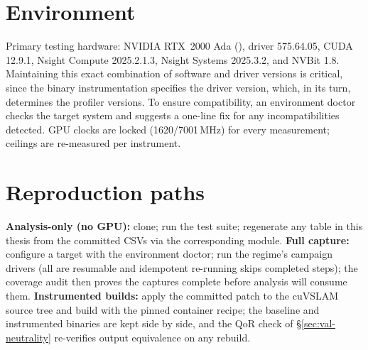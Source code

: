 \section{Environment}

Primary testing hardware: NVIDIA RTX~2000 Ada (), driver
575.64.05, CUDA 12.9.1, Nsight Compute 2025.2.1.3, Nsight Systems 2025.3.2,
and NVBit 1.8. Maintaining this exact combination of software and driver
versions is critical, since the binary instrumentation specifies the driver
version, which, in its turn, determines the profiler versions. To ensure
compatibility, an environment doctor checks the target system and suggests
a one-line fix for any incompatibilities detected. GPU clocks are locked
(1620/7001\,MHz) for every measurement; ceilings are re-measured per
instrument.

\section{Reproduction paths}

\textbf{Analysis-only (no GPU):} clone; run the test suite; regenerate any
table in this thesis from the committed CSVs via the corresponding
 module. \textbf{Full capture:} configure a target with the
environment doctor; run the regime's campaign drivers (all are resumable
and idempotent re-running skips completed steps); the coverage audit
then proves the captures complete before analysis will consume them.
\textbf{Instrumented builds:} apply the committed patch to the cuVSLAM
source tree and build with the pinned container recipe; the baseline and
instrumented binaries are kept side by side, and the QoR check of
\S\ref{sec:val-neutrality} re-verifies output equivalence on any rebuild.
